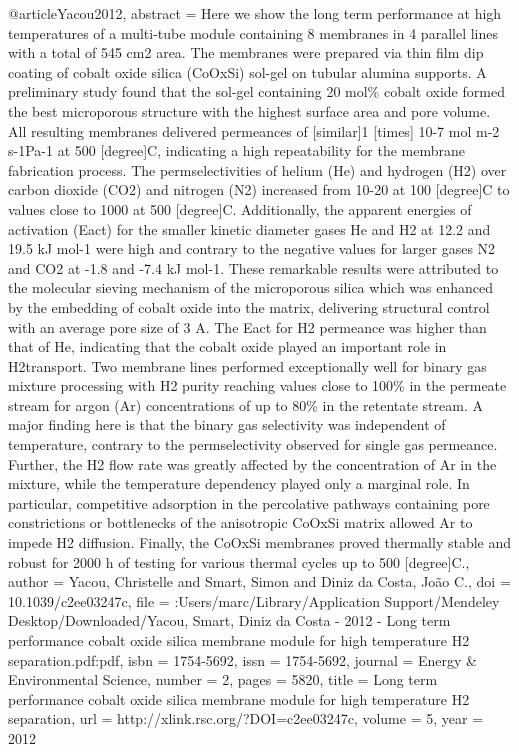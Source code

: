 @article{Yacou2012,
abstract = {Here we show the long term performance at high temperatures of a multi-tube module containing 8 membranes in 4 parallel lines with a total of 545 cm2 area. The membranes were prepared via thin film dip coating of cobalt oxide silica (CoOxSi) sol-gel on tubular alumina supports. A preliminary study found that the sol-gel containing 20 mol{\%} cobalt oxide formed the best microporous structure with the highest surface area and pore volume. All resulting membranes delivered permeances of [similar]1 [times] 10-7 mol m-2 s-1Pa-1 at 500 [degree]C, indicating a high repeatability for the membrane fabrication process. The permselectivities of helium (He) and hydrogen (H2) over carbon dioxide (CO2) and nitrogen (N2) increased from 10-20 at 100 [degree]C to values close to 1000 at 500 [degree]C. Additionally, the apparent energies of activation (Eact) for the smaller kinetic diameter gases He and H2 at 12.2 and 19.5 kJ mol-1 were high and contrary to the negative values for larger gases N2 and CO2 at -1.8 and -7.4 kJ mol-1. These remarkable results were attributed to the molecular sieving mechanism of the microporous silica which was enhanced by the embedding of cobalt oxide into the matrix, delivering structural control with an average pore size of 3 A. The Eact for H2 permeance was higher than that of He, indicating that the cobalt oxide played an important role in H2transport. Two membrane lines performed exceptionally well for binary gas mixture processing with H2 purity reaching values close to 100{\%} in the permeate stream for argon (Ar) concentrations of up to 80{\%} in the retentate stream. A major finding here is that the binary gas selectivity was independent of temperature, contrary to the permselectivity observed for single gas permeance. Further, the H2 flow rate was greatly affected by the concentration of Ar in the mixture, while the temperature dependency played only a marginal role. In particular, competitive adsorption in the percolative pathways containing pore constrictions or bottlenecks of the anisotropic CoOxSi matrix allowed Ar to impede H2 diffusion. Finally, the CoOxSi membranes proved thermally stable and robust for 2000 h of testing for various thermal cycles up to 500 [degree]C.},
author = {Yacou, Christelle and Smart, Simon and {Diniz da Costa}, Jo{\~{a}}o C.},
doi = {10.1039/c2ee03247c},
file = {:Users/marc/Library/Application Support/Mendeley Desktop/Downloaded/Yacou, Smart, Diniz da Costa - 2012 - Long term performance cobalt oxide silica membrane module for high temperature H2 separation.pdf:pdf},
isbn = {1754-5692},
issn = {1754-5692},
journal = {Energy {\&} Environmental Science},
number = {2},
pages = {5820},
title = {{Long term performance cobalt oxide silica membrane module for high temperature H2 separation}},
url = {http://xlink.rsc.org/?DOI=c2ee03247c},
volume = {5},
year = {2012}
}
